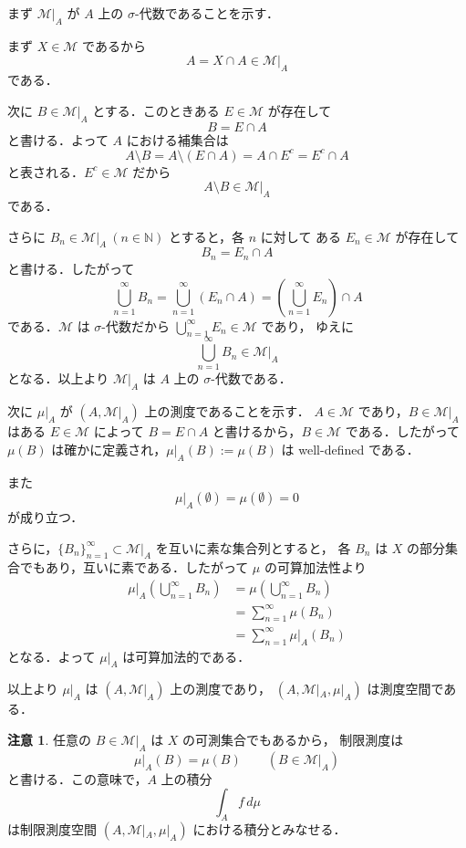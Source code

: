 \documentclass[dvipdfmx,a4paper,12pt]{jsarticle}
\makeatletter
\theoremstyle{definition}
\newtheorem{remark}[theorem]{注意}
\renewcommand{\proofname}{証明}
\renewenvironment{proof}[1][\proofname]{%
  \par\pushQED{\qed}%
  \normalfont \topsep6\p@\@plus6\p@\relax
  \trivlist
  \item[\hskip\labelsep\bfseries#1\@addpunct{.}]\ignorespaces
}{%
  \popQED\endtrivlist\@endpefalse
}
\makeatother
\begin{document}
\begin{proof}
    まず $\mathcal{M}|_A$ が $A$ 上の $\sigma$-代数であることを示す．

    まず $X\in\mathcal{M}$ であるから
    $$A=X\cap A\in\mathcal{M}|_A$$
    である．

    次に $B\in\mathcal{M}|_A$ とする．このときある $E\in\mathcal{M}$ が存在して
    $$B=E\cap A$$
    と書ける．よって $A$ における補集合は
    $$A\setminus B=A\setminus(E\cap A)=A\cap E^c=E^c\cap A$$
    と表される．$E^c\in\mathcal{M}$ だから
    $$A\setminus B\in\mathcal{M}|_A$$
    である．

    さらに $B_n\in\mathcal{M}|_A\ (n\in\mathbb{N})$ とすると，各 $n$ に対して
    ある $E_n\in\mathcal{M}$ が存在して
    $$B_n=E_n\cap A$$
    と書ける．したがって
    $$\bigcup_{n=1}^{\infty}B_n
    =\bigcup_{n=1}^{\infty}(E_n\cap A)
    =\left(\bigcup_{n=1}^{\infty}E_n\right)\cap A$$
    である．$\mathcal{M}$ は $\sigma$-代数だから $\bigcup_{n=1}^{\infty}E_n\in\mathcal{M}$ であり，
    ゆえに
    $$\bigcup_{n=1}^{\infty}B_n\in\mathcal{M}|_A$$
    となる．以上より $\mathcal{M}|_A$ は $A$ 上の $\sigma$-代数である．

    次に $\mu|_A$ が $(A,\mathcal{M}|_A)$ 上の測度であることを示す．
    $A\in\mathcal{M}$ であり，$B\in\mathcal{M}|_A$ はある $E\in\mathcal{M}$ によって
    $B=E\cap A$ と書けるから，$B\in\mathcal{M}$ である．したがって
    $\mu(B)$ は確かに定義され，$\mu|_A(B):=\mu(B)$ は well-defined である．

    また
    $$\mu|_A(\emptyset)=\mu(\emptyset)=0$$
    が成り立つ．

    さらに，$\{B_n\}_{n=1}^{\infty}\subset\mathcal{M}|_A$ を互いに素な集合列とすると，
    各 $B_n$ は $X$ の部分集合でもあり，互いに素である．したがって $\mu$ の可算加法性より
    \begin{align*}
        \mu|_A\!\left(\bigcup_{n=1}^{\infty}B_n\right)
        &=\mu\!\left(\bigcup_{n=1}^{\infty}B_n\right)\\
        &=\sum_{n=1}^{\infty}\mu(B_n)\\
        &=\sum_{n=1}^{\infty}\mu|_A(B_n)
    \end{align*}
    となる．よって $\mu|_A$ は可算加法的である．

    以上より $\mu|_A$ は $(A,\mathcal{M}|_A)$ 上の測度であり，
    $(A,\mathcal{M}|_A,\mu|_A)$ は測度空間である．
\end{proof}

\begin{remark}
    任意の $B\in\mathcal{M}|_A$ は $X$ の可測集合でもあるから，
    制限測度は
    $$\mu|_A(B)=\mu(B)\qquad (B\in\mathcal{M}|_A)$$
    と書ける．この意味で，$A$ 上の積分
    $$\int_A f\,d\mu$$
    は制限測度空間 $(A,\mathcal{M}|_A,\mu|_A)$ における積分とみなせる．
\end{remark}
\end{document}
